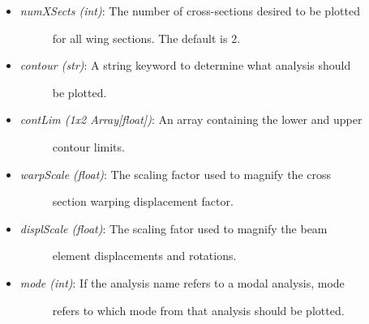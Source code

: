\documentclass[letterpaper,10pt,english]{sphinxmanual}
\begin{document}
\begin{fulllineitems}
\begin{fulllineitems}
\begin{itemize}
\begin{description}
\end{description}

\item {} \begin{description}
\item[{\emph{numXSects (int)}: The number of cross-sections desired to be plotted}] \leavevmode
for all wing sections. The default is 2.

\end{description}

\item {} \begin{description}
\item[{\emph{contour (str)}: A string keyword to determine what analysis should}] \leavevmode
be plotted.

\end{description}

\item {} \begin{description}
\item[{\emph{contLim (1x2 Array{[}float{]})}: An array containing the lower and upper}] \leavevmode
contour limits.

\end{description}

\item {} \begin{description}
\item[{\emph{warpScale (float)}: The scaling factor used to magnify the cross}] \leavevmode
section warping displacement factor.

\end{description}

\item {} \begin{description}
\item[{\emph{displScale (float)}: The scaling fator used to magnify the beam}] \leavevmode
element displacements and rotations.

\end{description}

\item {} \begin{description}
\item[{\emph{mode (int)}: If the analysis name refers to a modal analysis, mode}] \leavevmode
refers to which mode from that analysis should be plotted.

\end{description}


\end{itemize}
\end{fulllineitems}
\end{fulllineitems}
\end{document}
